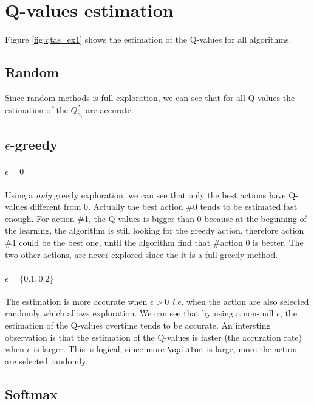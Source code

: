 \documentclass[letterpaper]{article}
\begin{document}
\section{Q-values estimation}

\label{sec:ex1_q_estim}

Figure \ref{fig:qtas_ex1} shows the estimation
of the Q-values for all algorithms.

\subsection*{Random}

Since random methods is full exploration, we can see that for all Q-values
the estimation of the $Q^*_{a_i}$ are accurate.


\subsection{$\epsilon$-greedy}

\paragraph{$\epsilon = 0$} Using a \textit{only} greedy exploration, we
can see that only the best actions have Q-values different from 0. Actually
the best action \#0 tends to be estimated fast enough. For action \#1, the
Q-values is bigger than 0 because at the beginning of the learning, the
algorithm is still looking for the greedy action, therefore action \#1
could be the best one, until the algorithm find that \#action 0 is better.
The two other actions, are never explored since the it is a full greedy
method.

\paragraph{$\epsilon = \{0.1, 0.2\}$}

The estimation is more accurate when $\epsilon > 0$ \textit{i.e.} when
the action are also selected randomly which allows exploration. We can see
that by using a non-null $\epsilon$, the estimation of the Q-values overtime
tends to be accurate. An intersting observation is that the estimation
of the Q-values is faster (the accuration rate)
when $\epsilon$ is larger. This is logical,
since more $\epislon$ is large, more the action are selected randomly.

\subsection*{Softmax}
\end{document}
